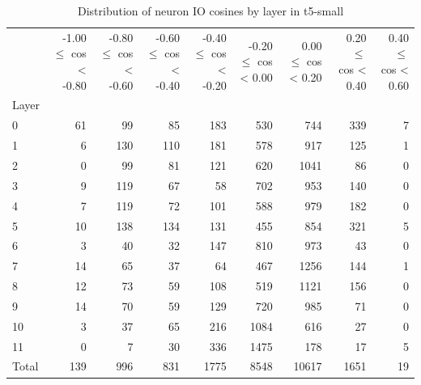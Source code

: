 \begin{table}
\caption{Distribution of neuron IO cosines by layer in t5-small}
\label{tab:t5-small_half_coarse}
\begin{tabular}{lrrrrrrrr}
 & -1.00 $\leq$ cos < -0.80 & -0.80 $\leq$ cos < -0.60 & -0.60 $\leq$ cos < -0.40 & -0.40 $\leq$ cos < -0.20 & -0.20 $\leq$ cos < 0.00 & 0.00 $\leq$ cos < 0.20 & 0.20 $\leq$ cos < 0.40 & 0.40 $\leq$ cos < 0.60 \\
Layer &  &  &  &  &  &  &  &  \\
0 & 61 & 99 & 85 & 183 & 530 & 744 & 339 & 7 \\
1 & 6 & 130 & 110 & 181 & 578 & 917 & 125 & 1 \\
2 & 0 & 99 & 81 & 121 & 620 & 1041 & 86 & 0 \\
3 & 9 & 119 & 67 & 58 & 702 & 953 & 140 & 0 \\
4 & 7 & 119 & 72 & 101 & 588 & 979 & 182 & 0 \\
5 & 10 & 138 & 134 & 131 & 455 & 854 & 321 & 5 \\
6 & 3 & 40 & 32 & 147 & 810 & 973 & 43 & 0 \\
7 & 14 & 65 & 37 & 64 & 467 & 1256 & 144 & 1 \\
8 & 12 & 73 & 59 & 108 & 519 & 1121 & 156 & 0 \\
9 & 14 & 70 & 59 & 129 & 720 & 985 & 71 & 0 \\
10 & 3 & 37 & 65 & 216 & 1084 & 616 & 27 & 0 \\
11 & 0 & 7 & 30 & 336 & 1475 & 178 & 17 & 5 \\
Total & 139 & 996 & 831 & 1775 & 8548 & 10617 & 1651 & 19 \\
\end{tabular}
\end{table}
